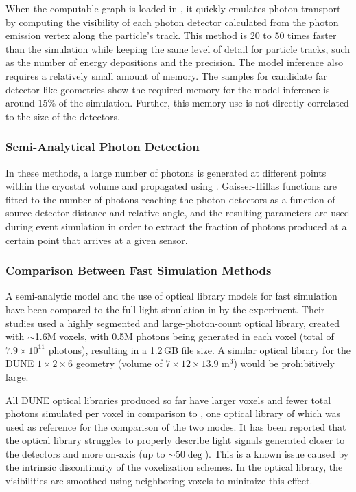 \documentclass[../main-v1.tex]{subfiles}
\begin{document}
When the computable graph is loaded in , it quickly emulates photon transport by  computing the visibility %
 of each photon detector calculated from  the photon emission vertex along the particle's track.
This method is 20 to 50 times faster than the  simulation while keeping the same level of detail for particle tracks, such as the number of energy depositions and the precision.
The model inference also requires a relatively small amount of memory. The samples for candidate  %
far detector-like geometries show the required memory for the model inference is around 15\% of the  simulation. Further, this memory use is not directly correlated to the size of the detectors. %

\subsubsection{Semi-Analytical Photon Detection}
In these methods, a large number of photons is generated at different points within the cryostat volume and propagated using . Gaisser-Hillas functions are fitted to the  number of 
photons reaching the photon detectors as a function of source-detector distance and relative angle, and the resulting parameters are used during event simulation  in order 
to extract the fraction of photons produced at a certain point that arrives at a given sensor.
 
\subsubsection{Comparison Between Fast Simulation Methods}
A semi-analytic model and the use of  optical library models for fast simulation have been compared to the full light simulation in  by the  experiment. Their studies used a highly segmented and large-photon-count optical library, created with $\sim$1.6M voxels, with 0.5M photons being 
generated in each voxel (total of $7.9 \times  10^{11}$ photons), resulting in a  1.2\,GB file size. A similar optical library for the DUNE $1\times2\times6$ geometry (volume of $7 \times 12 \times 13.9$ m$^3$) would be prohibitively large.

All DUNE optical libraries produced so far have larger voxels and fewer total photons simulated per voxel 
in comparison to  , one optical library of which 
was used as reference for the comparison of the two modes.
It has been reported that the optical library struggles to properly describe light signals generated closer to the detectors and more on-axis (up to $\sim50\deg$). This is a known issue caused by the intrinsic discontinuity of the voxelization schemes. In the  optical library, the visibilities are smoothed using neighboring voxels  to minimize this effect. 
\end{document}
